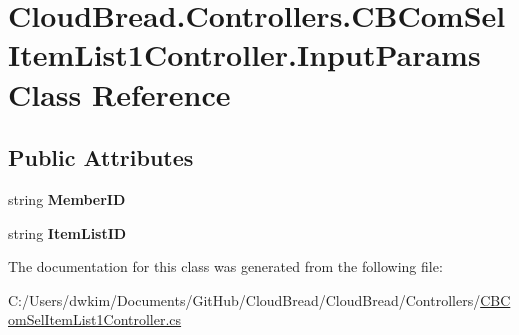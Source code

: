 \hypertarget{a00122}{}\section{Cloud\+Bread.\+Controllers.\+C\+B\+Com\+Sel\+Item\+List1\+Controller.\+Input\+Params Class Reference}
\label{a00122}
\subsection*{Public Attributes}
\begin{DoxyCompactItemize}
\item 
string {\bfseries Member\+ID}\hypertarget{a00122_a270a6cddccb850cd69129306fc15d9f9}{}\label{a00122_a270a6cddccb850cd69129306fc15d9f9}

\item 
string {\bfseries Item\+List\+ID}\hypertarget{a00122_ab2f3213effe1513033ae6015d9a799a7}{}\label{a00122_ab2f3213effe1513033ae6015d9a799a7}

\end{DoxyCompactItemize}


The documentation for this class was generated from the following file\+:\begin{DoxyCompactItemize}
\item 
C\+:/\+Users/dwkim/\+Documents/\+Git\+Hub/\+Cloud\+Bread/\+Cloud\+Bread/\+Controllers/\hyperlink{a00201}{C\+B\+Com\+Sel\+Item\+List1\+Controller.\+cs}\end{DoxyCompactItemize}
